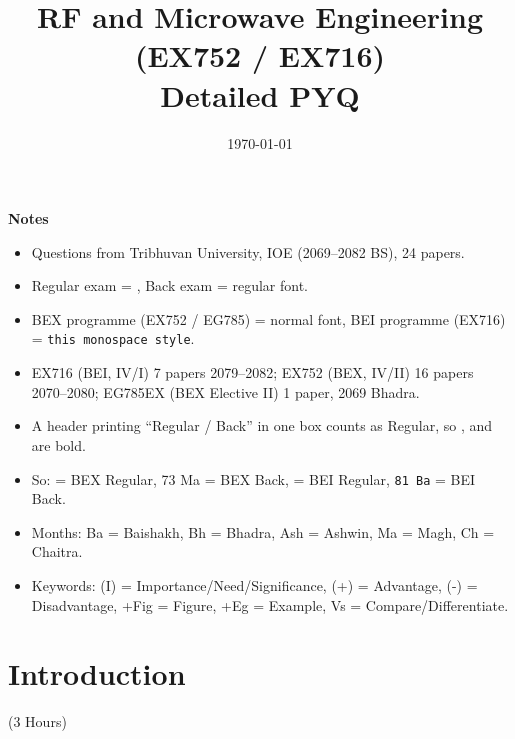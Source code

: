 \documentclass[12pt]{article}
\title{RF and Microwave Engineering (EX752 / EX716)\\[0.4em]\large Detailed PYQ}
\author{}
\date{\today}
\begin{document}
\maketitle
\vspace{6cm}
\textbf{Notes}
\begin{itemize}[noitemsep]
  \item Questions from Tribhuvan University, IOE (2069--2082 BS), 24 papers.
  \item Regular exam = , Back exam = regular font.
  \item BEX programme (EX752 / EG785) = normal font, BEI programme (EX716) = \texttt{this monospace style}.
  \item EX716 (BEI, IV/I) 7 papers 2079--2082; EX752 (BEX, IV/II) 16 papers 2070--2080; EG785EX (BEX Elective II) 1 paper, 2069 Bhadra.
  \item A header printing ``Regular / Back'' in one box counts as Regular, so ,  and  are bold.
  \item So:  = BEX Regular, 73 Ma = BEX Back,  = BEI Regular, \texttt{81 Ba} = BEI Back.
  \item Months: Ba = Baishakh, Bh = Bhadra, Ash = Ashwin, Ma = Magh, Ch = Chaitra.
  \item Keywords: (I) = Importance/Need/Significance, (+) = Advantage, (-) = Disadvantage, +Fig = Figure, +Eg = Example, Vs = Compare/Differentiate.
\end{itemize}
\pagebreak
\tableofcontents
\pagebreak

\section{Introduction}
\begin{center}(3 Hours)\end{center}
\end{document}
